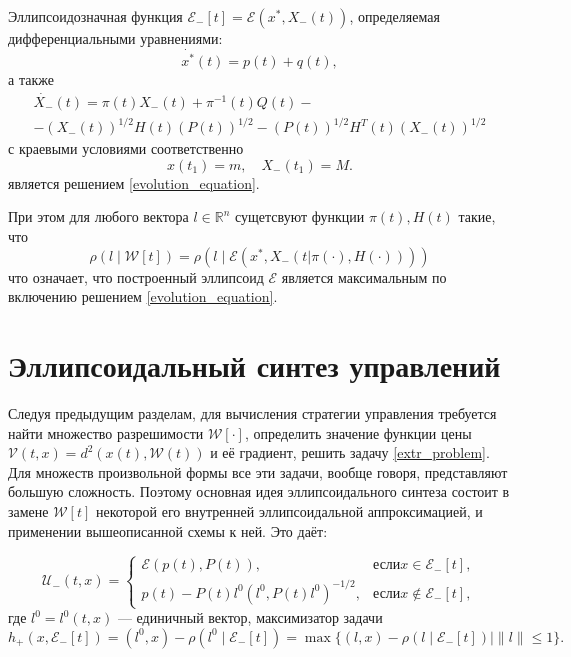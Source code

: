 \begin{theorem}
    Эллипсоидозначная функция \( \mathcal{E}_-[t] = \mathcal{E}(x^*, X_-(t)) \), определяемая
     дифференциальными уравнениями:
    \begin{equation}\label{dif_center}
        \dot{x^*}(t) = p(t) + q(t),
    \end{equation}
    а также
    \begin{equation}\label{dif_matrix}
        \begin{gathered}
            \dot{X_-}(t) = \pi(t) X_-(t) + \pi^{-1}(t) Q(t) - \\
             - (X_-(t))^{1/2} H(t) (P(t))^{1/2} - (P(t))^{1/2} H^T(t) (X_-(t))^{1/2}
        \end{gathered}
    \end{equation}
    с краевыми условиями соответственно
    \begin{equation}\label{dif_boundary}
        x(t_1) = m, \quad X_-(t_1) = M.
    \end{equation}
    является решением \eqref{evolution_equation}.
    
    При этом для любого вектора \( l \in \mathbb{R}^n \) сущетсвуют функции \( \pi(t), H(t) \) такие,
     что
    \begin{equation}
        \rho(l \mid \mathcal{W}[t]) = \rho(l \mid \mathcal{E}(x^*, X_-(t | \pi(\cdot), H(\cdot))))
    \end{equation}
    что означает, что построенный эллипсоид \( \mathcal{E} \) является максимальным по включению
     решением \eqref{evolution_equation}. 
\end{theorem}

\section{Эллипсоидальный синтез управлений}
Следуя предыдущим разделам, для вычисления стратегии управления требуется найти множество разрешимости
 \( \mathcal{W}[\cdot] \), определить значение функции цены \( \mathcal{V}(t,x) = d^2(x(t),
 \mathcal{W}(t)) \) и её градиент, решить задачу \eqref{extr_problem}. Для множеств произвольной формы
 все эти задачи, вообще говоря, представляют большую сложность. Поэтому основная идея эллипсоидального
 синтеза состоит в замене \( \mathcal{W}[t] \) некоторой его внутренней эллипсоидальной аппроксимацией,
 и применении вышеописанной схемы к ней. Это даёт:

\begin{equation}\label{control}
    \mathcal{U}_-(t,x) = 
     \begin{cases}
        \mathcal{E}(p(t), P(t)), & \text{если} x \in \mathcal{E}_-[t], \\
        p(t) - P(t)l^0(l^0, P(t)l^0)^{-1/2}, & \text{если} x \notin \mathcal{E}_-[t],
     \end{cases}
\end{equation}
где \( l^0 = l^0(t,x) \) --- единичный вектор, максимизатор задачи
\begin{equation}
    h_+(x, \mathcal{E}_-[t]) = (l^0,x) - \rho(l^0 \mid \mathcal{E}_-[t]) = \max\{(l,x) - \rho(l \mid 
     \mathcal{E}_-[t]) \mid \| l \| \le 1 \}.
\end{equation}

